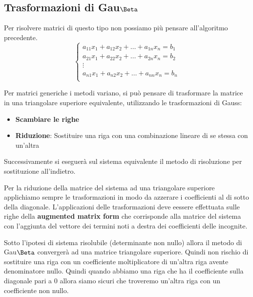 \subsection{Trasformazioni di Gau$\Beta$}
Per risolvere matrici di questo tipo non possiamo più pensare all'algoritmo precedente.
\begin{equation}
    \begin{cases}
        a_{11}x_1 + a_{12} x_2 + \dots + a_{1n} x_n= b_1 \\
        a_{21}x_1 + a_{22} x_2 + \dots + a_{2n} x_n= b_2 \\
        \vdots                                           \\
        a_{n1}x_1 + a_{n2} x_2 + \dots + a_{nn} x_n= b_n \\
    \end{cases} 
\end{equation}

Per matrici generiche i metodi variano, si può pensare di trasformare la matrice
in una triangolare superiore equivalente, utilizzando le trasformazioni di Gauss:
\begin{itemize}
    \item \textbf{Scambiare le righe}
    \item \textbf{Riduzione}: Sostituire una riga con una combinazione lineare di se stessa
              con un'altra
\end{itemize}
Successivamente si eseguerà sul sistema equivalente il metodo di risoluzione per 
sostituzione all'indietro.

Per la riduzione della matrice del sistema ad una triangolare superiore applichiamo 
sempre le trasformazioni in modo da azzerare i coefficienti al di sotto della 
diagonale. L'applicazioni delle trasformazioni deve eessere effettuata sulle righe 
della \textbf{augmented matrix form} che corrisponde alla matrice del sistema con
l'aggiunta del vettore dei termini noti a destra dei coefficienti delle incognite.

\begin{nota}
    Sotto l'ipotesi di sistema risolubile (determinante non nullo) allora il metodo 
    di Gau$\Beta$ convergerà ad una matrice triangolare superiore. Quindi non rischio
    di sostituire una riga con un coefficiente moltiplicatore di un'altra riga 
    avente denominatore nullo. Quindi quando abbiamo una riga che ha il coefficiente 
    sulla diagonale pari a $0$ allora siamo sicuri che troveremo un'altra riga 
    con un coefficiente non nullo.
\end{nota}

